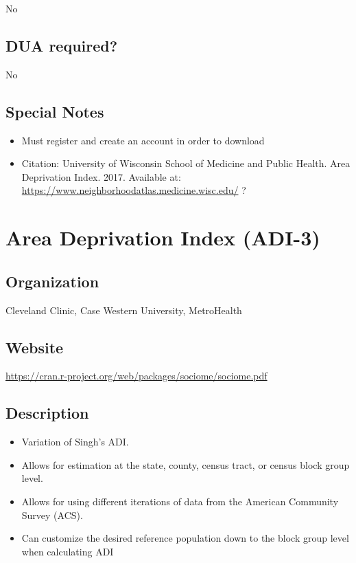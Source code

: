 \documentclass[
]{book}
\providecommand{\tightlist}{%
  \setlength{\itemsep}{0pt}\setlength{\parskip}{0pt}}
\begin{document}
No

\hypertarget{dua-required-8}{%
\section{DUA required?}\label{dua-required-8}}

No

\hypertarget{special-notes-8}{%
\section{Special Notes}\label{special-notes-8}}

\begin{itemize}
\tightlist
\item
  Must register and create an account in order to download
\item
  Citation: University of Wisconsin School of Medicine and Public Health. Area Deprivation Index. 2017. Available at: \url{https://www.neighborhoodatlas.medicine.wisc.edu/} ?
\end{itemize}

\mainmatter

\hypertarget{area-deprivation-index-adi-3}{%
\chapter{Area Deprivation Index (ADI-3)}\label{area-deprivation-index-adi-3}}

\hypertarget{organization-9}{%
\section{Organization}\label{organization-9}}

Cleveland Clinic, Case Western University, MetroHealth

\hypertarget{website-9}{%
\section{Website}\label{website-9}}

\url{https://cran.r-project.org/web/packages/sociome/sociome.pdf}

\hypertarget{description-9}{%
\section{Description}\label{description-9}}

\begin{itemize}
\tightlist
\item
  Variation of Singh's ADI.
\item
  Allows for estimation at the state, county, census tract, or census block group level.
\item
  Allows for using different iterations of data from the American Community Survey (ACS).
\item
  Can customize the desired reference population down to the block group level when calculating ADI
\end{itemize}
\end{document}
